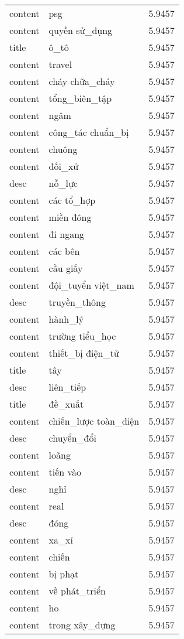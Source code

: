 \documentclass{article}
\begin{document}
\begin{tabular}{lll}
content & psg & 5.9457\\
content & quyền sử\_dụng & 5.9457\\
title & ô\_tô & 5.9457\\
content & travel & 5.9457\\
content & cháy chữa\_cháy & 5.9457\\
content & tổng\_biên\_tập & 5.9457\\
content & ngâm & 5.9457\\
content & công\_tác chuẩn\_bị & 5.9457\\
content & chuông & 5.9457\\
content & đối\_xử & 5.9457\\
desc & nỗ\_lực & 5.9457\\
content & các tổ\_hợp & 5.9457\\
content & miền đông & 5.9457\\
content & đi ngang & 5.9457\\
content & các bên & 5.9457\\
content & cầu giấy & 5.9457\\
content & đội\_tuyển việt\_nam & 5.9457\\
desc & truyền\_thông & 5.9457\\
content & hành\_lý & 5.9457\\
content & trường tiểu\_học & 5.9457\\
content & thiết\_bị điện\_tử & 5.9457\\
title & tây & 5.9457\\
desc & liên\_tiếp & 5.9457\\
title & đề\_xuất & 5.9457\\
content & chiến\_lược toàn\_diện & 5.9457\\
desc & chuyển\_đổi & 5.9457\\
content & loãng & 5.9457\\
content & tiến vào & 5.9457\\
desc & nghỉ & 5.9457\\
content & real & 5.9457\\
desc & đóng & 5.9457\\
content & xa\_xỉ & 5.9457\\
content & chiến & 5.9457\\
content & bị phạt & 5.9457\\
content & về phát\_triển & 5.9457\\
content & ho & 5.9457\\
content & trong xây\_dựng & 5.9457\\

\end{tabular}
\end{document}
